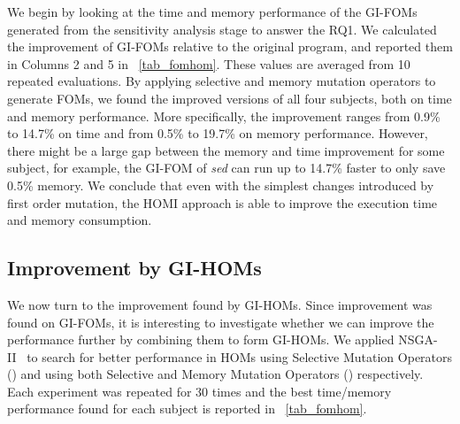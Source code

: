 \documentclass[oribibl]{llncs}
\begin{document}
We begin by looking at the time and memory performance of the GI-FOMs generated from the sensitivity analysis stage to answer the RQ1. We calculated the improvement of GI-FOMs relative to the original program, and reported them in Columns 2 and 5 in \tablename~\ref{tab_fomhom}. These values are averaged from 10 repeated evaluations. By applying selective and memory mutation operators to generate FOMs, we found the improved versions of all four subjects, both on time and memory performance. More specifically, the improvement ranges from 0.9\% to 14.7\% on time and from 0.5\% to 19.7\% on memory performance.  
However, there might be a large gap between the memory and time improvement for some subject, for example, the GI-FOM of \emph{sed} can run up to  14.7\%  faster to only save 0.5\% memory. We conclude that even with the simplest changes introduced by first order mutation, the HOMI approach is able to improve the execution time and memory consumption. 



\subsection{Improvement by GI-HOMs}
\label{sec_reshom}

We now turn to the improvement found by GI-HOMs. Since improvement was found on GI-FOMs, it is interesting to investigate whether we can improve the performance further by combining them to form GI-HOMs. We applied NSGA-II~\cite{996017} to search for better performance in HOMs using Selective Mutation Operators (\homss{}) and using both Selective and Memory Mutation Operators (\homsa{}) respectively. Each experiment was repeated for 30 times and the best time/memory performance found for each subject is reported in \tablename~\ref{tab_fomhom}. 
\end{document}
